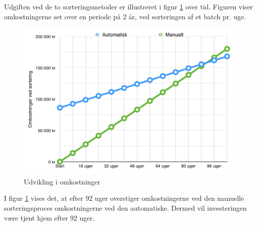 \newpage
Udgiften ved de to sorteringsmetoder er illustreret i figur \ref{fig:costbenefit} over tid. Figuren viser omkostningerne set over en periode på 2 år, ved sorteringen af et batch pr. uge.

\begin{figure}[H]
	\centering
	\includegraphics[width=1\textwidth]{billeder/Hovedrapport/costbenefit2.png}
	\caption{Udvikling i omkostninger }
	\label{fig:costbenefit}
\end{figure}

I figur \ref{fig:costbenefit} vises det, at efter 92 uger overstiger omkostningerne ved den manuelle sorteringsproces omkostningerne ved den automatiske. Dermed vil investeringen være tjent hjem efter 92 uger. 